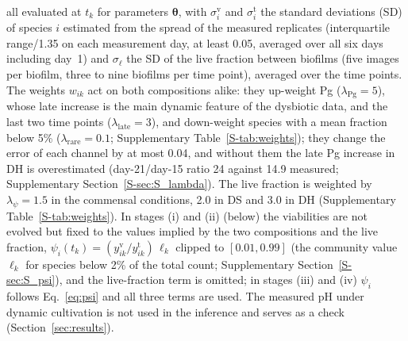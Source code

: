 \documentclass[preprint,12pt]{elsarticle}
\newcommand{\btheta}{\boldsymbol{\theta}}
\begin{document}
all evaluated at $t_k$ for parameters $\btheta$, with $\sigma^{\mathrm{v}}_{i}$ and $\sigma^{\mathrm{t}}_{i}$ the standard deviations (SD) of species $i$ estimated from the spread of the measured replicates (interquartile range/1.35 on each measurement day, at least 0.05, averaged over all six days including day~1) and $\sigma_\ell$ the SD of the live fraction between biofilms (five images per biofilm, three to nine biofilms per time point), averaged over the time points.
The weights $w_{ik}$ act on both compositions alike: they up-weight Pg ($\lambda_{\mathrm{Pg}}=5$), whose late increase is the main dynamic feature of the dysbiotic data, and the last two time points ($\lambda_{\mathrm{late}}=3$), and down-weight species with a mean fraction below 5\% ($\lambda_{\mathrm{rare}}=0.1$; Supplementary Table~\ref{S-tab:weights}); they change the error of each channel by at most 0.04, and without them the late Pg increase in DH is overestimated (day-21/day-15 ratio 24 against 14.9 measured; Supplementary Section~\ref{S-sec:S_lambda}).
The live fraction is weighted by $\lambda_\psi=1.5$ in the commensal conditions, 2.0 in DS and 3.0 in DH (Supplementary Table~\ref{S-tab:weights}).
In stages (i) and (ii) (below) the viabilities are not evolved but fixed to the values implied by the two compositions and the live fraction, $\psi_i(t_k)=(y^{\mathrm{v}}_{ik}/y^{\mathrm{t}}_{ik})\,\ell_k$ clipped to $[0.01,0.99]$ (the community value $\ell_k$ for species below 2\% of the total count; Supplementary Section~\ref{S-sec:S_psi}), and the live-fraction term is omitted; in stages (iii) and (iv) $\psi_i$ follows Eq.~\eqref{eq:psi} and all three terms are used.
The measured pH under dynamic cultivation is not used in the inference and serves as a check (Section~\ref{sec:results}).
\end{document}
